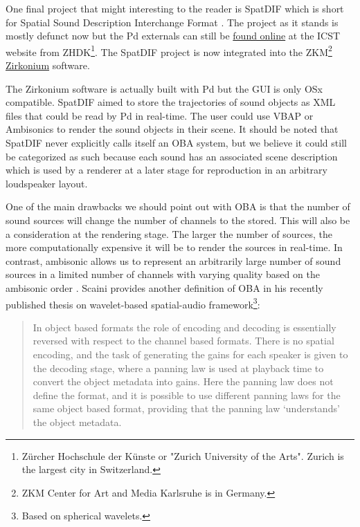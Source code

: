 One final project that might interesting to the reader is SpatDIF which is short for Spatial Sound Description Interchange Format \cite{peters2012spatdif}. The project as it stands is mostly defunct now but the Pd externals can still be \href{https://www.zhdk.ch/en/research/icst}{found online} at the ICST website from ZHDK\footnote{Zürcher Hochschule der Künste or "Zurich University of the Arts". Zurich is the largest city in Switzerland.}. The SpatDIF project is now integrated into the ZKM\footnote{ZKM Center for Art and Media Karlsruhe is in Germany.} \href{https://zkm.de/en/about-the-zkm/organization/hertz-lab/software/zirkonium}{Zirkonium} software. 

The Zirkonium software is actually built with Pd but the GUI is only OSx compatible. SpatDIF aimed to store the trajectories of sound objects as XML files that could be read by Pd in real-time. The user could use VBAP or Ambisonics to render the sound objects in their scene. It should be noted that SpatDIF never explicitly calls itself an OBA system, but we believe it could still be categorized as such because each sound has an associated scene description which is used by a renderer at a later stage for reproduction in an arbitrary loudspeaker layout. 

One of the main drawbacks we should point out with OBA is that the number of sound sources will change the number of channels to the stored. This will also be a consideration at the rendering stage. The larger the number of sources, the more computationally expensive it will be to render the sources in real-time. In contrast, ambisonic allows us to represent an arbitrarily large number of sound sources in a limited number of channels with varying quality based on the ambisonic order \cite{scaini2020wavelet}. Scaini provides another definition of OBA in his recently published thesis on wavelet-based spatial-audio framework\footnote{Based on spherical wavelets.}: 

\begin{quote}
    In object based formats the role of encoding and decoding is essentially reversed with respect to the channel based formats. There is no spatial encoding, and the task of generating the gains for each speaker is given to the decoding stage, where a panning law is used at playback time to convert the object metadata into gains. Here the panning law does not define the format, and it is possible to use different panning laws for the same object based format, providing that the panning law ‘understands’ the object metadata.
\end{quote}

